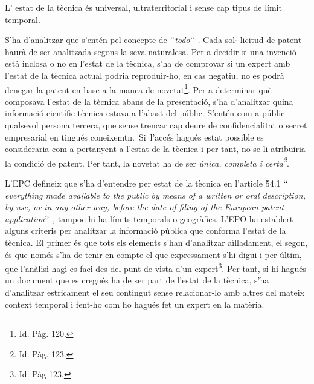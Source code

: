 \documentclass[12pt]{article}
\begin{document}
\begin{justify}
L’ estat de la tècnica és universal, ultraterritorial i sense cap tipus de límit temporal. 
\end{justify}\par


\vspace{\baselineskip}
\begin{justify}
S’ha d’analitzar que s’entén pel concepte de \textit{$``$todo$"$ .} Cada sol$ \cdot $ licitud de patent haurà de ser analitzada segons la seva naturalesa. Per a decidir si una invenció està inclosa o no en l’estat de la tècnica, s’ha de comprovar si un expert amb l’estat de la tècnica actual podria reproduir-ho, en cas negatiu, no es podrà denegar la patent en base a la manca de novetat\footnote{ Id. Pàg. 120. }.  Per a determinar què composava l’estat de la tècnica abans de la presentació, s’ha d’analitzar quina informació científic-tècnica estava a l’abast del públic. S’entén com a públic qualsevol persona tercera, que sense trencar cap deure de confidencialitat o secret empresarial en tingués coneixemtn.\ Si\ l’accés hagués estat possible es consideraria com a pertanyent a l’estat de la tècnica i per tant, no se li atribuiria la condició de patent.   Per tant, la novetat ha de ser \textit{única, completa i certa\footnote{ Id. Pàg. 123. }}.  
\end{justify}\par


\vspace{\baselineskip}
\begin{justify}
L’EPC defineix que s’ha d’entendre per estat de la tècnica en l’article 54.1 \textit{$``$everything made available to the public by means of a written or oral description, by use, or in any other way, before the date of filing of the European patent application$"$ , }tampoc hi ha límits temporals o geogràfics. L’EPO ha establert alguns criteris per analitzar la informació pública que conforma l’estat de la tècnica. El primer és que tots els elements s’han d’analitzar aïlladament, el segon, és que només s’ha de tenir en compte el que expressament s’hi digui i per últim, que l’anàlisi hagi es faci des del punt de vista d’un expert\footnote{ Id. Pàg 123.  }. Per tant, si hi hagués un document que es cregués ha de ser part de l’estat de la tècnica, s’ha d’analitzar estricament el seu contingut sense relacionar-lo amb altres del mateix context temporal i fent-ho com ho hagués fet un expert en la matèria. 
\end{justify}\par
\end{document}
